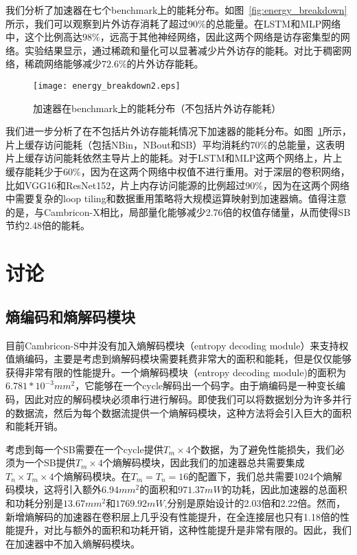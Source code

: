 我们分析了加速器在七个benchmark上的能耗分布。如图~\ref{fig:energy_breakdown}所示，我们可以观察到片外访存消耗了超过$90\%$的总能量。在LSTM和MLP网络中，这个比例高达$98\%$，远高于其他神经网络，因此这两个网络是访存密集型的网络。实验结果显示，通过稀疏和量化可以显著减少片外访存的能耗。对比于稠密网络，稀疏网络能够减少$72.6\%$的片外访存能耗。

\begin{figure}[h]
\centering
\texttt{[image: energy\_breakdown2.eps]}
\caption{加速器在benchmark上的能耗分布（不包括片外访存能耗）}
\label{fig:energy_breakdown2}
\end{figure}

我们进一步分析了在不包括片外访存能耗情况下加速器的能耗分布。如图~\ref{fig:energy_breakdown2}所示，片上缓存访问能耗（包括NBin，NBout和SB）平均消耗约$70\%$的总能量，这表明片上缓存访问能耗依然主导片上的能耗。对于LSTM和MLP这两个网络上，片上缓存能耗少于$60\%$，因为在这两个网络中权值不进行重用。对于深层的卷积网络，比如VGG16和ResNet152，片上内存访问能源的比例超过$90\%$，因为在这两个网络中需要复杂的loop tiling和数据重用策略将大规模运算映射到加速器熵。值得注意的是，与Cambricon-X相比，局部量化能够减少2.76倍的权值存储量，从而使得SB节约2.48倍的能耗。

\section{讨论}

\subsection{熵编码和熵解码模块}

目前Cambricon-S中并没有加入熵解码模块（entropy decoding module）来支持权值熵编码，主要是考虑到熵解码模块需要耗费非常大的面积和能耗，但是仅仅能够获得非常有限的性能提升。一个熵解码模块（entropy decoding module)的面积为$6.781*10^{-3}mm^2$，它能够在一个cycle解码出一个码字。由于熵编码是一种变长编码，因此对应的解码模块必须串行进行解码。即使我们可以将数据划分为许多并行的数据流，然后为每个数据流提供一个熵解码模块，这种方法将会引入巨大的面积和能耗开销。

考虑到每一个SB需要在一个cycle提供$T_m\times 4$个数据，为了避免性能损失，我们必须为一个SB提供$T_m\times 4$个熵解码模块，因此我们的加速器总共需要集成$T_n\times T_m\times 4$个熵解码模块。在$T_m = T_n = 16$的配置下，我们总共需要1024个熵解码模块，这将引入额外$6.94mm^2$的面积和$971.37mW$的功耗，因此加速器的总面积和功耗分别是$13.67mm^2$和$1769.92mW$,分别是原始设计的2.03倍和2.22倍。然而，新增熵解码的加速器在卷积层上几乎没有性能提升，在全连接层也只有1.18倍的性能提升，对比与额外的面积和功耗开销，这种性能提升是非常有限的。因此，我们在加速器中不加入熵解码模块。

